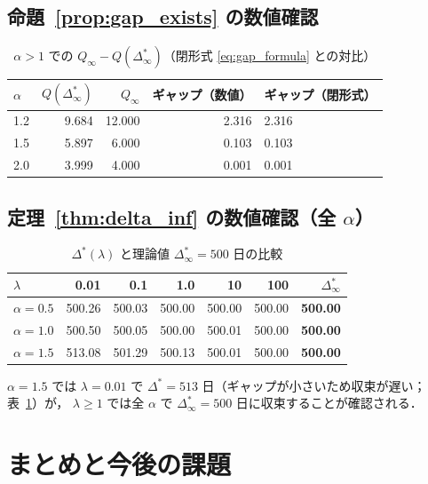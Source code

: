 \documentclass[12pt,a4paper]{article}
\theoremstyle{plain}
\theoremstyle{definition}
\theoremstyle{remark}
\newcommand{\Dopt}{\Delta^{*}}
\newcommand{\Dinf}{\Delta^{*}_{\infty}}
\begin{document}
\subsection{命題~\ref{prop:gap_exists} の数値確認}

\begin{table}[h]
\centering
\caption{$\alpha>1$ での $Q_\infty-Q(\Dinf)$（閉形式 \eqref{eq:gap_formula} との対比）}
\label{tab:gap}
\begin{tabular}{@{}lrrrl@{}}
\toprule
$\alpha$ & $Q(\Dinf)$ & $Q_\infty$ & ギャップ（数値） & ギャップ（閉形式）\\
\midrule
1.2 & 9.684 & 12.000 & 2.316 & 2.316 \\
1.5 & 5.897 & 6.000 & 0.103 & 0.103 \\
2.0 & 3.999 & 4.000 & 0.001 & 0.001 \\
\bottomrule
\end{tabular}
\end{table}

\subsection{定理~\ref{thm:delta_inf} の数値確認（全 $\alpha$）}

\begin{table}[h]
\centering
\caption{$\Dopt(\lambda)$ と理論値 $\Dinf=500$ 日の比較}
\label{tab:delta_lambda}
\begin{tabular}{@{}lrrrrrr@{}}
\toprule
$\lambda$ & 0.01 & 0.1 & 1.0 & 10 & 100 & $\Dinf$ \\
\midrule
$\alpha=0.5$ & 500.26 & 500.03 & 500.00 & 500.00 & 500.00 & \textbf{500.00} \\
$\alpha=1.0$ & 500.50 & 500.05 & 500.00 & 500.01 & 500.00 & \textbf{500.00} \\
$\alpha=1.5$ & 513.08 & 501.29 & 500.13 & 500.01 & 500.00 & \textbf{500.00} \\
\bottomrule
\end{tabular}
\end{table}

$\alpha=1.5$ では $\lambda=0.01$ で $\Dopt=513$ 日（ギャップが小さいため収束が遅い；表~\ref{tab:gap}）が，
$\lambda\ge1$ では全 $\alpha$ で $\Dinf=500$ 日に収束することが確認される．

\section{まとめと今後の課題}
\label{sec:conclusion}
\end{document}
